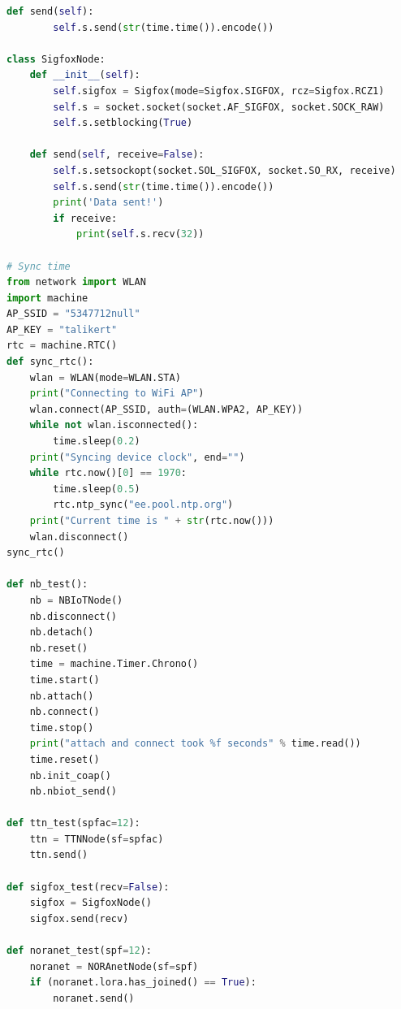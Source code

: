 \documentclass[12pt]{article}
\begin{document}
\begin{spacing}{0.8}
\begin{lstlisting}[language=Python]
    def send(self):
        self.s.send(str(time.time()).encode())

class SigfoxNode:
    def __init__(self):
        self.sigfox = Sigfox(mode=Sigfox.SIGFOX, rcz=Sigfox.RCZ1)
        self.s = socket.socket(socket.AF_SIGFOX, socket.SOCK_RAW)
        self.s.setblocking(True)

    def send(self, receive=False):
        self.s.setsockopt(socket.SOL_SIGFOX, socket.SO_RX, receive)
        self.s.send(str(time.time()).encode())
        print('Data sent!')
        if receive:
            print(self.s.recv(32))

# Sync time
from network import WLAN
import machine
AP_SSID = "5347712null"
AP_KEY = "talikert"
rtc = machine.RTC()
def sync_rtc():
    wlan = WLAN(mode=WLAN.STA)
    print("Connecting to WiFi AP")
    wlan.connect(AP_SSID, auth=(WLAN.WPA2, AP_KEY))
    while not wlan.isconnected():
        time.sleep(0.2)
    print("Syncing device clock", end="")
    while rtc.now()[0] == 1970:
        time.sleep(0.5)
        rtc.ntp_sync("ee.pool.ntp.org")
    print("Current time is " + str(rtc.now()))
    wlan.disconnect()
sync_rtc()

def nb_test():
    nb = NBIoTNode()
    nb.disconnect()
    nb.detach()
    nb.reset()
    time = machine.Timer.Chrono()
    time.start()
    nb.attach()
    nb.connect()
    time.stop()
    print("attach and connect took %f seconds" % time.read())
    time.reset()
    nb.init_coap()
    nb.nbiot_send()

def ttn_test(spfac=12):
    ttn = TTNNode(sf=spfac)
    ttn.send()

def sigfox_test(recv=False):
    sigfox = SigfoxNode()
    sigfox.send(recv)

def noranet_test(spf=12):
    noranet = NORAnetNode(sf=spf)
    if (noranet.lora.has_joined() == True):
        noranet.send()
    \end{lstlisting}
\end{spacing}

    \newpage
\end{document}
